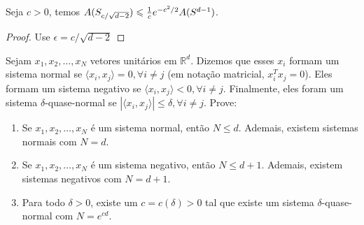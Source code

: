 \begin{lema}
Seja $c > 0$, temos $A(S_{c/\sqrt{d-2}}) \leqslant {1 \over c} e^{-c^2/2} A(S^{d-1})$.
\end{lema}

\begin{proof}
Use $\epsilon = c/\sqrt{d-2}$
\end{proof}

\begin{exercicio}
Sejam $x_1, x_2, \dots, x_N$ vetores unitários em $\mathbb{R}^d$. Dizemos que esses $x_i$ formam um sistema normal se $\langle x_i, x_j \rangle = 0, \forall i \not = j$ (em notação matricial, $x_i^Tx_j = 0$). Eles formam um sistema negativo se $\langle x_i, x_j \rangle < 0, \forall i \not = j$. Finalmente, eles foram um sistema $\delta$-quase-normal se $| \langle x_i, x_j \rangle | \leqslant \delta, \forall i \not = j$. Prove:

\begin{enumerate}
\item Se $x_1, x_2, \dots, x_N$ é um sistema normal, então $N \leqslant d$. Ademais, existem sistemas normais com $N = d$.
\item Se $x_1, x_2, \dots, x_N$ é um sistema negativo, então $N \leqslant d+1$. Ademais, existem sistemas negativos com $N = d+1$.
\item Para todo $\delta > 0$, existe um $c = c(\delta) > 0$ tal que existe um sistema $\delta$-quase-normal com $N = e^{cd}$.
\end{enumerate}
\end{exercicio}

